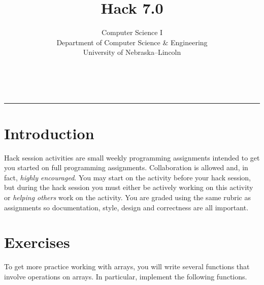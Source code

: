 \documentclass[12pt]{scrartcl}
\title{Hack 7.0}\let\Title\@title
\subtitle{Computer Science I\\
{\small
\vskip1cm
Department of Computer Science \& Engineering \\
University of Nebraska--Lincoln}
\vskip-1cm}
\date{~}
\begin{document}
\maketitle

\hrule

\section*{Introduction}

Hack session activities are small weekly programming assignments intended
to get you started on full programming assignments.  Collaboration is allowed
and, in fact, \emph{highly encouraged}.  You may start on the activity before
your hack session, but during the hack session you must either be actively 
working on this activity or \emph{helping others} work on the activity.
You are graded using the same rubric as assignments so documentation, style, 
design and correctness are all important.  

\section*{Exercises}

To get more practice working with arrays, you will write several 
functions that involve operations on arrays.  In particular, implement
the following functions.
\end{document}
